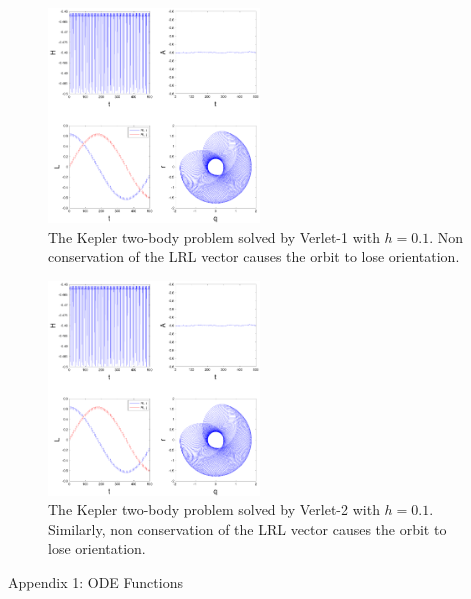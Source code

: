 \documentclass[11pt]{article}
\begin{document}
\begin{enumerate}
\begin{figure}[h!]
  \centering
    \includegraphics[width=0.5\textwidth]{andy_hw05_prb12_01.pdf}
  \caption{The Kepler two-body problem solved by Verlet-1 with $h = 0.1$. Non conservation of the LRL vector causes the orbit to lose orientation.}
\end{figure}

\begin{figure}[h!]
  \centering
    \includegraphics[width=0.5\textwidth]{andy_hw05_prb12_02.pdf}
  \caption{The Kepler two-body problem solved by Verlet-2 with $h = 0.1$. Similarly, non conservation of the LRL vector causes the orbit to lose orientation.}
\end{figure}

\end{enumerate}



\clearpage
\pagebreak
{\huge Appendix 1: ODE Functions}
\end{document}
